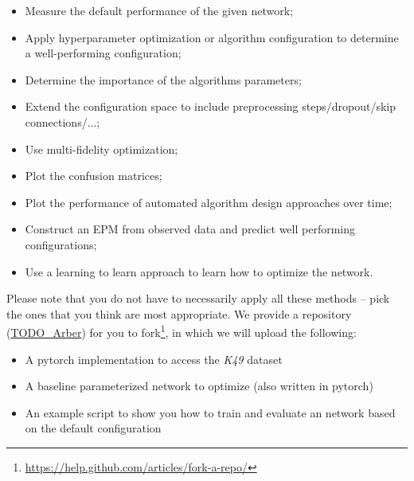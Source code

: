 \documentclass[10pt,a4paper]{article}
\begin{document}
		\begin{itemize}
			\item Measure the default performance of the given network;
			\item Apply hyperparameter optimization or algorithm configuration to determine a well-performing configuration;
			\item Determine the importance of the algorithms parameters;
			\item Extend the configuration space to include preprocessing steps/dropout/skip connections/...;
			\item Use multi-fidelity optimization;
			\item Plot the confusion matrices;
			\item Plot the performance of automated algorithm design approaches over time; 
			\item Construct an EPM from observed data and predict well performing configurations;
			\item Use a learning to learn approach to learn how to optimize the network. 
		\end{itemize}
		\noindent
		Please note that you do not have to necessarily apply all these methods -- pick the ones that you think are most appropriate.
		We provide a repository (\url{TODO_Arber}) for you to fork\footnote{\url{https://help.github.com/articles/fork-a-repo/}}, in which we will upload the following:
		\begin{itemize}
			\item A pytorch implementation to access the \textit{K49} dataset
			\item A baseline parameterized network to optimize (also written in pytorch)
			\item An example script to show you how to train and evaluate an network based on the default configuration
		\end{itemize}
		
\end{document}
